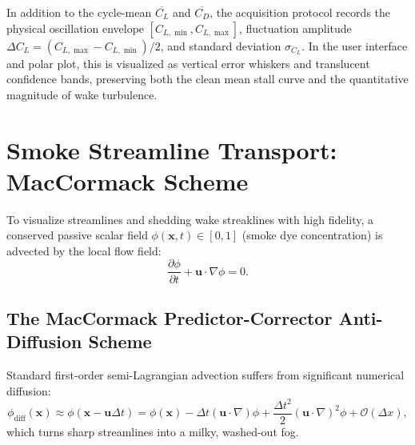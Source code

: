 \documentclass[11pt,a4paper]{article}
\begin{document}
In addition to the cycle-mean $\overline{C_L}$ and $\overline{C_D}$, the acquisition protocol records the physical oscillation envelope $[C_{L,\min}, C_{L,\max}]$, fluctuation amplitude $\Delta C_L = (C_{L,\max} - C_{L,\min})/2$, and standard deviation $\sigma_{C_L}$. In the user interface and polar plot, this is visualized as vertical error whiskers and translucent confidence bands, preserving both the clean mean stall curve and the quantitative magnitude of wake turbulence.

\section{Smoke Streamline Transport: MacCormack Scheme}

To visualize streamlines and shedding wake streaklines with high fidelity, a conserved passive scalar field $\phi(\mathbf{x}, t) \in [0, 1]$ (smoke dye concentration) is advected by the local flow field:
\begin{equation}
\frac{\partial \phi}{\partial t} + \mathbf{u} \cdot \nabla \phi = 0.
\end{equation}

\subsection{The MacCormack Predictor-Corrector Anti-Diffusion Scheme}
Standard first-order semi-Lagrangian advection suffers from significant numerical diffusion:
\begin{equation}
\phi_{\text{diff}}(\mathbf{x}) \approx \phi(\mathbf{x} - \mathbf{u}\Delta t) = \phi(\mathbf{x}) - \Delta t (\mathbf{u}\cdot\nabla)\phi + \frac{\Delta t^2}{2} (\mathbf{u}\cdot\nabla)^2 \phi + \mathcal{O}(\Delta x),
\end{equation}
which turns sharp streamlines into a milky, washed-out fog.
\end{document}
